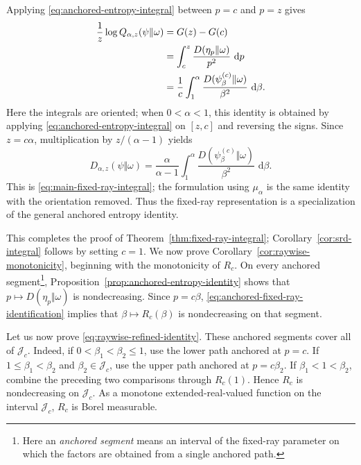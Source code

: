 \documentclass[12pt]{article}
\numberwithin{equation}{section}
\theoremstyle{definition}
\theoremstyle{remark}
\newcommand{\dd}{\,\mathrm d}
\newcommand{\?}{\overset{?}{=}}
\begin{document}
Applying \eqref{eq:anchored-entropy-integral} between $p=c$ and $p=z$
gives
\begin{align}
  \frac1z\log Q_{\alpha,z}(\psi\|\omega)
  &=
  G(z)-G(c)\notag\\
  &=
  \int_c^z
  \frac{D(\eta_p\Vert\omega)}{p^2}\,\dd p\notag\\
  &=
  \frac1c
  \int_1^\alpha
  \frac{D(\psi_\beta^{(c)}\Vert\omega)}{\beta^2}\,\dd\beta.
  \label{eq:fixed-ray-from-anchored-identity}
\end{align}
Here the integrals are oriented; when $0<\alpha<1$, this identity is
obtained by applying
\eqref{eq:anchored-entropy-integral} on $[z,c]$ and reversing the signs.
Since $z=c\alpha$, multiplication by $z/(\alpha-1)$ yields
\begin{equation}
  D_{\alpha,z}(\psi\Vert\omega)
  =
  \frac{\alpha}{\alpha-1}
  \int_1^\alpha
  \frac{D(\psi_\beta^{(c)}\Vert\omega)}{\beta^2}\,\dd\beta.
\end{equation}
This is \eqref{eq:main-fixed-ray-integral}; the formulation using
$\mu_\alpha$ is the same identity with the orientation removed.  Thus the
fixed-ray representation is a specialization of the general anchored
entropy identity.

This completes the proof of Theorem~\ref{thm:fixed-ray-integral}; 
Corollary~\ref{cor:srd-integral} follows by
setting \(c=1\).  We now prove Corollary~\ref{cor:raywise-monotonicity}, 
beginning with the monotonicity of \(R_c\).  On every anchored
segment\footnote{Here an \emph{anchored segment} means an interval of the fixed-ray
parameter on which the factors are obtained from a single anchored
path.}, Proposition~\ref{prop:anchored-entropy-identity} shows that
$p\mapsto D(\eta_p\Vert\omega)$ is nondecreasing.  Since $p=c\beta$,
\eqref{eq:anchored-fixed-ray-identification} implies that
$\beta\mapsto R_c(\beta)$ is nondecreasing on that segment.

Let us now prove \eqref{eq:raywise-refined-identity}. These anchored 
segments cover all of $\mathcal J_c$.  Indeed, if
$0<\beta_1<\beta_2\leq1$, use the lower path anchored at $p=c$.  If
$1\leq\beta_1<\beta_2$ and $\beta_2\in\mathcal J_c$, use the upper path
anchored at $p=c\beta_2$.  If $\beta_1<1<\beta_2$, combine the preceding
two comparisons through $R_c(1)$.  Hence $R_c$ is nondecreasing on
$\mathcal J_c$. As a monotone extended-real-valued function 
on the interval \(\mathcal J_c\), \(R_c\) is Borel measurable.
\end{document}
